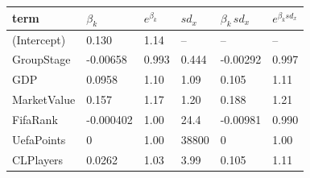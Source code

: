 
\begin{tabular}{llllll}
\toprule
term & $\beta_k$ & $e^{\beta_k}$ & $sd_x$ & $\beta_k \, sd_x$ & $e^{\beta_k sd_x}$\\
\midrule
(Intercept) & 0.130 & 1.14 & -- & -- & --\\
GroupStage & -0.00658 & 0.993 & 0.444 & -0.00292 & 0.997\\
GDP & 0.0958 & 1.10 & 1.09 & 0.105 & 1.11\\
MarketValue & 0.157 & 1.17 & 1.20 & 0.188 & 1.21\\
FifaRank & -0.000402 & 1.00 & 24.4 & -0.00981 & 0.990\\
UefaPoints & 0 & 1.00 & 38800 & 0 & 1.00\\
CLPlayers & 0.0262 & 1.03 & 3.99 & 0.105 & 1.11\\
\bottomrule
\end{tabular}
